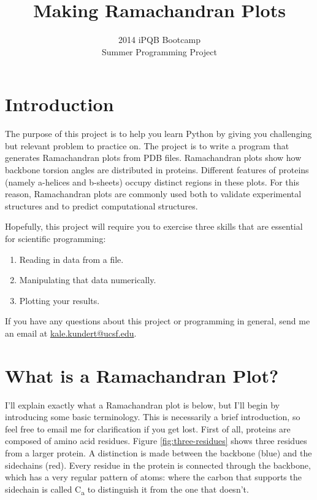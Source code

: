 \documentclass{article}
\newcommand{\calpha}{C\textsubscript{\textgreek{a}}}
\newcommand{\ahelices}{\textgreek{a}-helices}
\newcommand{\bsheets}{\textgreek{b}-sheets}
\begin{document}
\title{Making Ramachandran Plots}
\author{2014 iPQB Bootcamp\\Summer Programming Project}
\date{}
\maketitle{}

\section{Introduction}

The purpose of this project is to help you learn Python by giving you 
challenging but relevant problem to practice on.  The project is to write a 
program that generates Ramachandran plots from PDB files.  Ramachandran plots 
show how backbone torsion angles are distributed in proteins.  Different 
features of proteins (namely \ahelices{} and \bsheets{}) occupy distinct 
regions in these plots.  For this reason, Ramachandran plots are commonly used 
both to validate experimental structures and to predict computational 
structures.

Hopefully, this project will require you to exercise three skills that are 
essential for scientific programming:

\begin{enumerate}
 \item Reading in data from a file.
 \item Manipulating that data numerically.
 \item Plotting your results.
\end{enumerate}

If you have any questions about this project or programming in general, send me 
an email at \href{mailto:kale.kundert@ucsf.edu}{kale.kundert@ucsf.edu}.

\section{What is a Ramachandran Plot?}

I'll explain exactly what a Ramachandran plot is below, but I'll begin by 
introducing some basic terminology.  This is necessarily a brief introduction, 
so feel free to email me for clarification if you get lost.  First of all, 
proteins are composed of amino acid residues.  Figure \ref{fig:three-residues} 
shows three residues from a larger protein.  A distinction is made between the 
backbone (blue) and the sidechains (red).  Every residue in the protein is 
connected through the backbone, which has a very regular pattern of atoms: 
 where the 
carbon that supports the sidechain is called \calpha{} to distinguish it from 
the one that doesn't.
\end{document}
